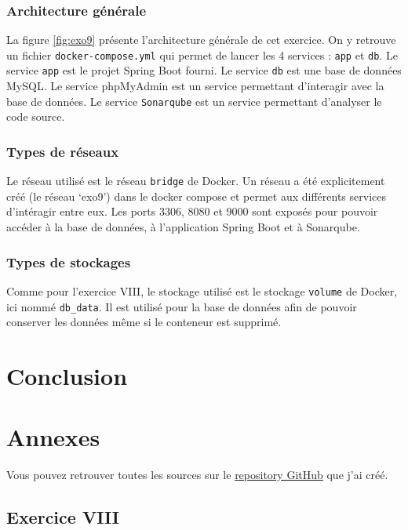 \subsubsection*{Architecture générale}
La figure \ref{fig:exo9} présente l'architecture générale de cet exercice. On y retrouve un fichier \verb|docker-compose.yml| qui permet de lancer les 4 services : \verb|app| et \verb|db|. Le service \verb|app| est le projet Spring Boot fourni. Le service \verb|db| est une base de données MySQL. Le service phpMyAdmin est un service permettant d'interagir avec la base de données. Le service \verb|Sonarqube| est un service permettant d'analyser le code source.
\subsubsection*{Types de réseaux}
Le réseau utilisé est le réseau \verb|bridge| de Docker. Un réseau a été explicitement créé (le réseau `exo9') dans le docker compose et permet aux différents services d'intéragir entre eux. Les ports 3306, 8080 et 9000 sont exposés pour pouvoir accéder à la base de données, à l'application Spring Boot et à Sonarqube.
\subsubsection*{Types de stockages}
Comme pour l'exercice VIII, le stockage utilisé est le stockage \verb|volume| de Docker, ici nommé \verb|db_data|. Il est utilisé pour la base de données afin de pouvoir conserver les données même si le conteneur est supprimé.
\section{Conclusion}

\section{Annexes}\label{sec:Annexes}
Vous pouvez retrouver toutes les sources sur le \href{https://github.com/RemiSaurel/docker-homework}{repository GitHub} que j'ai créé.

\subsection*{Exercice VIII}

